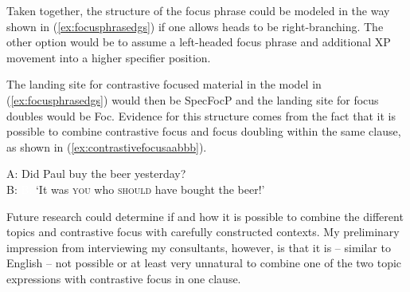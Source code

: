 Taken together, the structure of the focus phrase could be modeled in the way shown in (\ref{ex:focusphrasedgs}) if one allows heads to be right-branching. The other option would be to assume a left-headed focus phrase and additional XP movement into a higher specifier position.

\begin{exe}
\ex\label{ex:focusphrasedgs} 
\end{exe}

\noindent The landing site for contrastive focused material in the model in (\ref{ex:focusphrasedgs}) would then be SpecFocP and the landing site for focus doubles would be Foc\textdegree . Evidence for this structure comes from the fact that it is possible to combine contrastive focus and focus doubling within the same clause, as shown in (\ref{ex:contrastivefocusaabbb}).

\begin{exe}
\ex
A: Did Paul buy the beer yesterday? \\
B:   
\glt \textcolor{white}{B: }`It was \textsc{you} who \textsc{should} have bought the beer!' \label{ex:contrastivefocusaabbb}
\end{exe}

\noindent Future research could determine if and how it is possible to combine the different topics and contrastive focus with carefully constructed contexts. My preliminary impression from interviewing my consultants, however, is that it is -- similar to English -- not possible or at least very unnatural to combine one of the two topic expressions with contrastive focus in one clause.  




